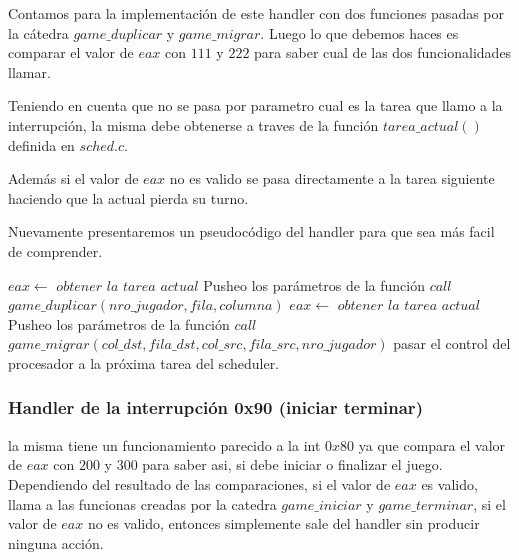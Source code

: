 \documentclass[a4paper,10pt,twoside]{article}
\newenvironment{pseudocodigo}
    {\vspace{0.5em} \begin{algorithmic}}
    {\end{algorithmic} \vspace{0.5em}}
\begin{document}
Contamos para la implementación de este handler con dos funciones pasadas por la cátedra $game\_duplicar$ y $game\_migrar$. Luego lo que debemos haces es comparar el valor de $eax$ con $111$ y $222$ para saber cual de las dos funcionalidades llamar.

Teniendo en cuenta que no se pasa por parametro cual es la tarea que llamo a la interrupción, la misma debe obtenerse a traves de la función $tarea\_actual()$ definida en $sched.c$.

Además si el valor de $eax$ no es valido se pasa directamente a la tarea siguiente haciendo que la actual pierda su turno.

Nuevamente presentaremos un pseudocódigo del handler para que sea más facil de comprender.

\begin{pseudocodigo}
  \STATE
  \STATE $eax \leftarrow$ $obtener$ $la$ $tarea$ $actual$
    \STATE Pusheo los parámetros de la función
    \STATE $call$ $game\_duplicar(nro\_jugador,fila,columna)$
  \ELSE
    \STATE $eax \leftarrow$ $obtener$ $la$ $tarea$ $actual$
    \STATE Pusheo los parámetros de la función
      \STATE $call$ $ game\_migrar(col\_dst,fila\_dst,col\_src,fila\_src,nro\_jugador)$
    \ELSE
      \STATE pasar el control del procesador a la próxima tarea del scheduler.
    \ENDIF
  \ENDIF
\end{pseudocodigo}



\subsubsection{Handler de la interrupción 0x90 (iniciar terminar) }
la misma tiene un funcionamiento parecido a la int $0x80$ ya que compara el valor de $eax$ con $200$ y $300$ para saber asi, si debe iniciar o finalizar el juego. Dependiendo del resultado de las comparaciones, si el valor de $eax$ es valido, llama a las funcionas creadas por la catedra $game\_iniciar$ y $game\_terminar$, si el valor de $eax$ no es valido, entonces simplemente sale del handler sin producir ninguna acción.
\end{document}
